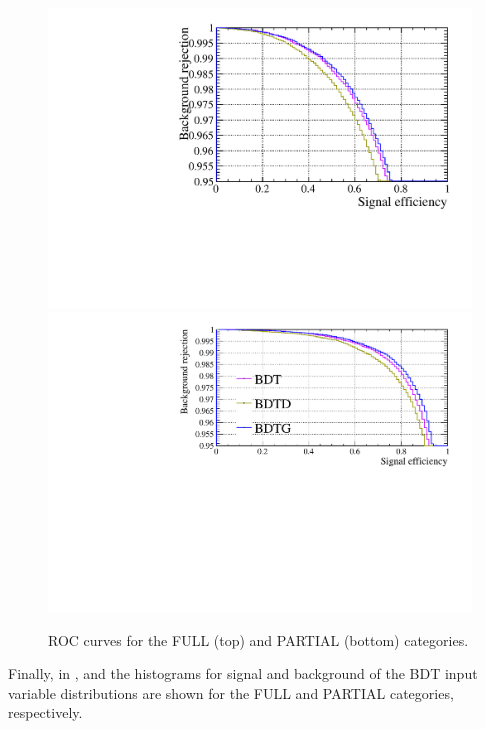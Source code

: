 \begin{figure} [htb!]
\begin{center}
\includegraphics[scale=0.50]{figs/GL_BDT_Kspi0_pi0.pdf}
\includegraphics[scale=0.50]{figs/GL_BDT_Kspi0_nopi0_VC.pdf}
\caption{ROC curves for the FULL (top) and PARTIAL (bottom) categories.  \label{fig:ROC}} %
\end{center}

\end{figure}

Finally, in , and  the histograms for signal and background of the BDT input variable distributions are shown for the FULL and PARTIAL categories, respectively. 

